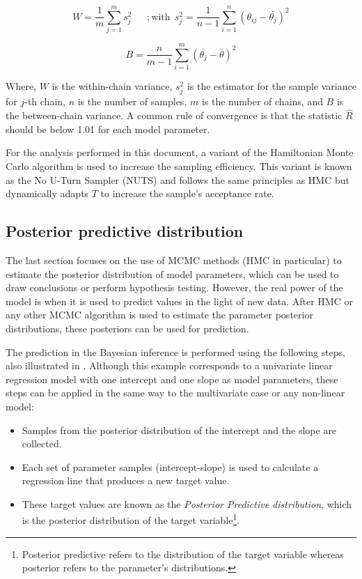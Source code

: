 \begin{equation}
    W = \frac{1}{m}\sum_{j=1}^{m}s_{j}^{2}\ \ \ \ \ \ \ ; \text{with} \ \ s_{j}^{2}=\frac{1}{n-1}\sum_{i=1}^{n}(\theta_{ij}-\bar{\theta_{j}})^2
\end{equation}

\begin{equation}
    B=\frac{n}{m-1}\sum_{i=1}^{m}(\bar{\theta_{j}}-\bar{\theta})^2
\end{equation}

Where, $W$ is the within-chain variance, $s_j^2$ is the estimator for the sample variance for $j$-th chain, $n$ is the number of samples, $m$ is the number of chains, and $B$ is the between-chain variance. A common rule of convergence is that the statistic $\hat{R}$ should be below 1.01 for each model parameter.

For the analysis performed in this document, a variant of the Hamiltonian Monte Carlo algorithm is used to increase the sampling efficiency. This variant is known as the No U-Turn Sampler (NUTS) and follows the same principles as HMC but dynamically adapts $T$ to increase the sample's acceptance rate.

\subsection{Posterior predictive distribution }

The last section focuses on the use of MCMC methods (HMC in particular) to estimate the posterior distribution of model parameters, which can be used to draw conclusions or perform hypothesis testing. However, the real power of the model is when it is used to predict values in the light of new data. After HMC or any other MCMC algorithm is used to estimate the parameter posterior distributions, these posteriors can be used for prediction. 

The prediction in the Bayesian inference is performed using the following steps, also illustrated in . Although this example corresponds to a univariate linear regression model with one intercept and one slope as model parameters, these steps can be applied in the same way to the multivariate case or any non-linear model: 

\begin{itemize}
    \item Samples from the posterior distribution of the intercept and the slope are collected. 

    \item Each set of parameter samples (intercept-slope) is used to calculate a regression line that produces a new target value. 
    
    \item These target values are known as the \textit{Posterior Predictive distribution}, which is the posterior distribution of the target variable\footnote{Posterior predictive refers to the distribution of the target variable whereas posterior refers to the parameter's distributions.}. 
\end{itemize}

